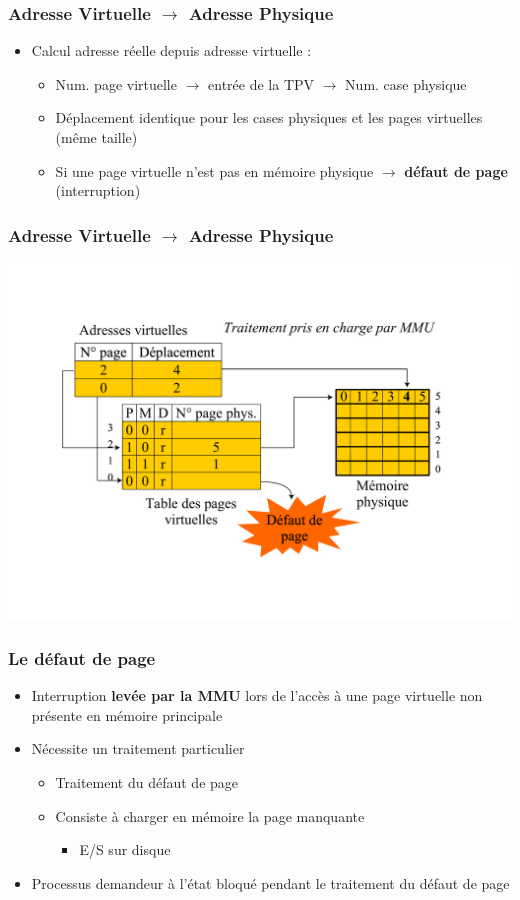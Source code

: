 \begin{frame}
\frametitle{Adresse Virtuelle $\rightarrow$ Adresse Physique}
\begin{itemize}
\item Calcul adresse réelle depuis adresse virtuelle :
\begin{itemize}
\item Num. page virtuelle $\rightarrow$ entrée de la TPV $\rightarrow$ Num. case physique
\item Déplacement identique pour les cases physiques et les pages virtuelles (même taille)
\item Si une page virtuelle n'est pas en mémoire physique $\rightarrow$ \textbf{défaut de page} (interruption)
\end{itemize}
\end{itemize}
\end{frame}


\begin{frame}
\frametitle{Adresse Virtuelle $\rightarrow$ Adresse Physique}
\includegraphics[width=\textwidth]{../illustration/table_pages_virtuelles_acces.pdf}
\end{frame}



\begin{frame}
\frametitle{Le défaut de page}
\begin{itemize}
\item Interruption \textbf{levée par la MMU} lors de l'accès à une page virtuelle non présente en mémoire principale
\item Nécessite un traitement particulier
\begin{itemize}
\item Traitement du défaut de page
\item Consiste à charger en mémoire la page manquante
\begin{itemize}
\item E/S sur disque
\end{itemize}
\end{itemize}
\item Processus demandeur à l'état bloqué pendant le traitement du défaut de page
\end{itemize}
\end{frame}



